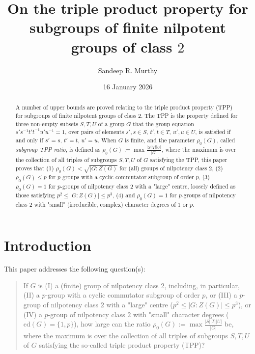 \documentclass{amsart}
\theoremstyle{observation}
\theoremstyle{definition}
\theoremstyle{remark}
\numberwithin{equation}{section}
\begin{document}
\title[TPP Triples of Subgroups and Finite Nilpotent Groups of Class $2$]{On the triple product property for subgroups of finite nilpotent groups of class $2$}
\author{Sandeep R. Murthy}
\address{}
\curraddr{}
\date{16 January 2026}
\dedicatory{}

\begin{abstract}
{A number of upper bounds are proved relating to the triple product property (TPP) for subgroups of finite nilpotent groups of class $2$. The TPP is the property defined for three non-empty subsets $S, T, U$ of a group $G$ that the group equation $s's^{-1}t't^{-1}u'u^{-1} = 1$, over pairs of elements $s', s \in S$, $t', t \in T$, $u', u \in U$, is satisfied if and only if $s' = s$, $t' = t$, $u' = u$. When $G$ is finite, and the parameter $\rho_0(G)$, called \emph{subgroup TPP ratio}, is defined as $\rho_0(G) := \max\frac{|S||T||U|}{|G|}$, where the maximum is over the collection of all triples of subgroups $S, T, U$ of $G$ satisfying the TPP, this paper proves that \textup{(1)} $\rho_0(G) < \sqrt{|G:Z(G)}$} for (all) groups of nilpotency class $2$, \textup{(2)} $\rho_0(G) \leq p$ for $p$-groups with a cyclic commutator subgroup of order $p$, \textup{(3)} $\rho_0(G) = 1$ for $p$-groups of nilpotency class $2$ with a "large" centre, loosely defined as those satisfying $p^2 \leq |G:Z(G)| \leq p^3$, \textup{(4)} and $\rho_0(G) = 1$ for $p$-groups of nilpotency class $2$ with "small" (irreducible, complex) character degrees of $1$ or $p$.
\end{abstract}

\maketitle

\tableofcontents

\section{Introduction}

This paper addresses the following question(s):

\begin{quote}\label{Q1} If $G$ is \textup{(I)} a (finite) group of nilpotency class $2$, including, in particular, \textup{(II)} a $p$-group with a cyclic commutator subgroup of order $p$, or \textup{(III)} a $p$-group of nilpotency class $2$ with a "large" centre ($p^2 \leq |G:Z(G)| \leq p^3$), or \textup{(IV)} a $p$-group of nilpotency class $2$ with "small" character degrees ($\text{cd}(G) = \{1, p\}$), how large can the ratio $\rho_0(G) := \max \frac{|S||T||U|}{|G|}$ be, where the maximum is over the collection of all triples of subgroups $S, T, U$ of $G$ satisfying the so-called triple product property (TPP)? 
\end{quote}
\end{document}
